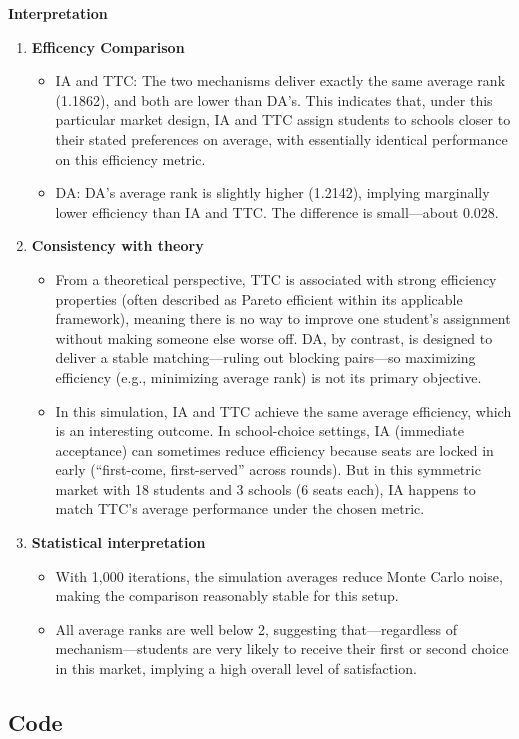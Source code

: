 \documentclass[12pt,oneside]{article}
\begin{document}
\textbf{Interpretation}
\begin{enumerate}
	\item \textbf{Efficency Comparison}
	\begin{itemize}
		\item IA and TTC: The two mechanisms deliver exactly the same average rank (1.1862), and both are lower than DA’s. This indicates that, under this particular market design, IA and TTC assign students to schools closer to their stated preferences on average, with essentially identical performance on this efficiency metric.
		\item DA: DA’s average rank is slightly higher (1.2142), implying marginally lower efficiency than IA and TTC. The difference is small—about 0.028.
	\end{itemize}
	\item \textbf{Consistency with theory}
	\begin{itemize}
		\item From a theoretical perspective, TTC is associated with strong efficiency properties (often described as Pareto efficient within its applicable framework), meaning there is no way to improve one student’s assignment without making someone else worse off. DA, by contrast, is designed to deliver a stable matching—ruling out blocking pairs—so maximizing efficiency (e.g., minimizing average rank) is not its primary objective.
		\item 	In this simulation, IA and TTC achieve the same average efficiency, which is an interesting outcome. In school-choice settings, IA (immediate acceptance) can sometimes reduce efficiency because seats are locked in early (“first-come, first-served” across rounds). But in this symmetric market with 18 students and 3 schools (6 seats each), IA happens to match TTC’s average performance under the chosen metric.
	\end{itemize}
	\item \textbf{Statistical interpretation}
	\begin{itemize}
		\item With 1,000 iterations, the simulation averages reduce Monte Carlo noise, making the comparison reasonably stable for this setup.
		\item All average ranks are well below 2, suggesting that—regardless of mechanism—students are very likely to receive their first or second choice in this market, implying a high overall level of satisfaction.
	\end{itemize}
\end{enumerate}



\subsection{Code}

\end{document}
